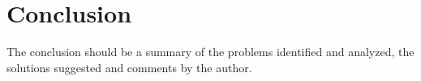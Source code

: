 
\chapter{Conclusion}

The conclusion should be a summary of the problems identified and analyzed, the solutions suggested and comments by the author.
